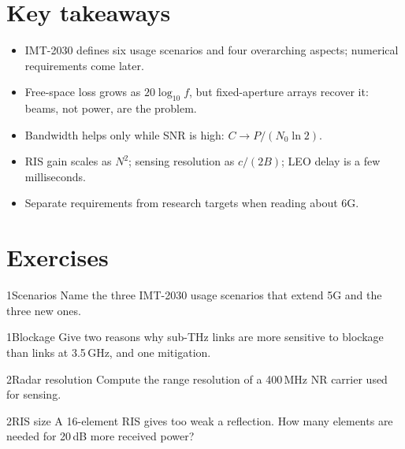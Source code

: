 \documentclass[11pt,a4paper]{article}
\begin{document}
\section{Key takeaways}
\begin{takeawaybox}
\begin{itemize}
  \item IMT-2030 defines six usage scenarios and four overarching aspects; numerical requirements come later.
  \item Free-space loss grows as $20\log_{10} f$, but fixed-aperture arrays recover it: beams, not power, are the problem.
  \item Bandwidth helps only while SNR is high: $C \to P/(N_0 \ln 2)$.
  \item RIS gain scales as $N^2$; sensing resolution as $c/(2B)$; LEO delay is a few milliseconds.
  \item Separate requirements from research targets when reading about 6G.
\end{itemize}
\end{takeawaybox}

\section{Exercises}

\begin{exercisebox}{1}{Scenarios}\label{exr:scen}
Name the three IMT-2030 usage scenarios that extend 5G and the three new ones.
\end{exercisebox}

\begin{exercisebox}{1}{Blockage}\label{exr:block}
Give two reasons why sub-THz links are more sensitive to blockage than links at 3.5\,GHz, and one mitigation.
\end{exercisebox}

\begin{exercisebox}{2}{Radar resolution}\label{exr:range}
Compute the range resolution of a 400\,MHz NR carrier used for sensing.
\end{exercisebox}

\begin{exercisebox}{2}{RIS size}\label{exr:ris}
A 16-element RIS gives too weak a reflection. How many elements are needed for 20\,dB more received power?
\end{exercisebox}
\end{document}

